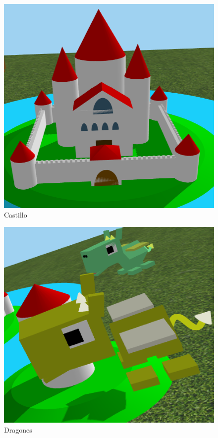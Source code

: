 \documentclass[11pt]{article}
\begin{document}
\begin{figure}[H]
    \centering    
    \includegraphics[scale=0.7]{img/castillo.png}
    \caption{Castillo}
\end{figure}

\begin{figure}[H]
    \centering    
    \includegraphics[scale=0.7]{img/dragones.PNG}
    \caption{Dragones}
\end{figure}
\end{document}
